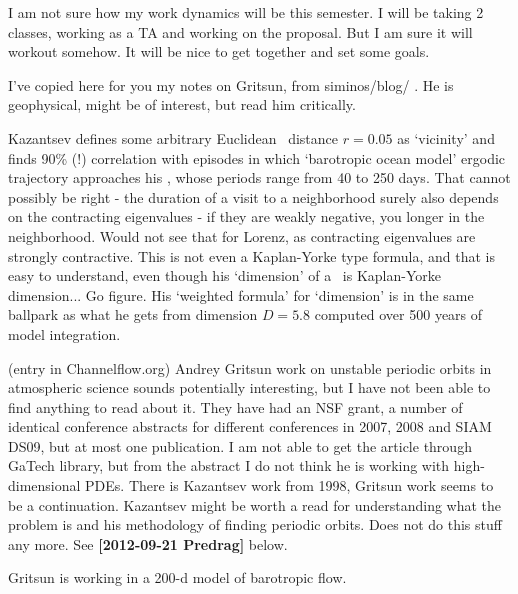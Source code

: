 \begin{description}
I am not sure how my work dynamics will be this semester. I will be
taking 2 classes, working as a TA and working on the proposal. But I am
sure it will workout somehow. It will be nice to get together and set
some goals.

\item[2013-04-19  Predrag to Sebastian] I've copied here for you my notes
on Gritsun, from siminos/blog/ . He is geophysical, might be of interest, but
read him critically.

\item[2012-09-13 Predrag]
Kazantsev defines some arbitrary Euclidean \statesp\
distance $r=0.05$ as `vicinity' and finds 90\% (!) correlation with
episodes in which `barotropic ocean model' ergodic trajectory approaches
his \po, whose periods range from 40 to 250 days. That cannot possibly be
right - the duration of a visit to a neighborhood surely also depends on
the contracting eigenvalues - if they are weakly negative, you longer in
the neighborhood. Would not see that for Lorenz, as contracting
eigenvalues are strongly contractive. This is not even a Kaplan-Yorke
type formula, and that is easy to understand, even though his `dimension'
of a \po\ is Kaplan-Yorke dimension... Go figure. His `weighted formula'
for `dimension' is in the same ballpark as what he gets from dimension
$D=5.8$ computed over 500 years of model integration.

\item[2009-05-01 Predrag]
(entry in
{Channelflow.org}) Andrey Gritsun work on unstable periodic orbits in
atmospheric science sounds potentially interesting, but I have not been
able to find anything to read about it. They have had an
{NSF grant}, a number of identical conference abstracts for different
conferences in 2007, 2008 and SIAM DS09, but at most one
publication. I am not able to get the article through
GaTech library, but from the abstract I do not think he is working with
high-dimensional PDEs. There is Kazantsev work\rf{Kazantsev98} from 1998,
Gritsun work seems to be a continuation. Kazantsev might be worth a read
for understanding what the problem is and his methodology of finding
periodic orbits.
{Does not do this} stuff any more. See {\bf [2012-09-21 Predrag]} below.

\item[2009-05-02 John Gibson]
Gritsun is working in a 200-d model of barotropic flow.


\end{description}
